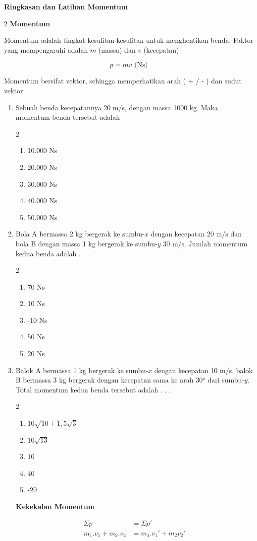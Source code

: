 \documentclass[11pt,a4paper]{extarticle}
\newcommand{\pilgani}[1]{                            \vspace{-0.3cm}\begin{multicols}{2}
 \begin{enumerate}[label=\Alph*., itemsep=0pt,topsep=0pt,leftmargin=*,align=Center]#1                     \end{enumerate}
 \phantom{ini cuma sapi, wedus, dan ayam}
 \end{multicols}}
\begin{document}
 \textbf{Ringkasan dan Latihan Momentum} \phantom{ini nama siswa yang aaamengerjakan soal kuis ini }  

\begin{multicols*}{2}
\textbf{Momentum}

Momentum adalah tingkat kesulitan kesulitan untuk menghentikan benda. Faktor yang mempengaruhi adalah $m$ (massa) dan $v$ (kecepatan)

$$ p = m v \text{  (Ns)}$$

Momentum bersifat vektor, sehingga memperhatikan arah ( + / - ) dan sudut vektor 


\begin{enumerate}
\item Sebuah benda kecepatannya 20 m/s, dengan massa 1000 kg. Maka momentum benda tersebut adalah 
\pilgani{
        \item 10.000 Ns
        \item 20.000 Ns
        \item 30.000 Ns
        \item 40.000 Ns
        \item 50.000 Ns
        }
\item Bola A bermassa 2 kg bergerak ke sumbu-$x$ dengan kecepatan 20 m/s dan bola B dengan massa 1 kg bergerak ke sumbu-$y$ 30 m/s. Jumlah momentum kedua benda adalah . . .
\pilgani{
        \item 70 Ns
        \item 10 Ns
        \item -10 Ns
        \item 50 Ns
        \item 20 Ns
        }

\item Balok A bermassa 1 kg bergerak ke sumbu-$x$ dengan kecepatan 10 m/s, balok B bermassa 3 kg bergerak dengan kecepatan sama ke arah 30$^o$ dari sumbu-$y$. Total momentum kedua benda tersebut adalah . . .
\pilgani{
        \item $10\sqrt{10+1,5\sqrt{3}}$
        \item $10\sqrt{13}$
        \item $10$
        \item $40$
        \item -20
        }
\vspace{3cm}
\textbf{Kekekalan Momentum}

\begin{align*}
\Sigma p &= \Sigma p'\\
m_1.v_1 + m_2.v_2 &= m_1.v_1' +m_2v_2'\\
\end{align*}


\end{enumerate}
\end{multicols*}
\end{document}
